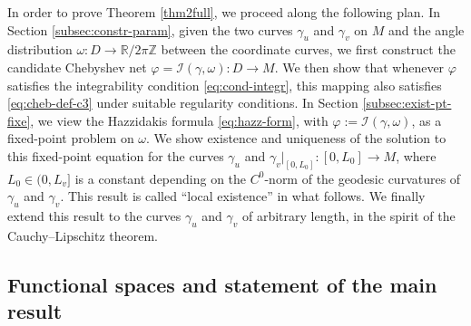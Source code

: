 \documentclass{article}
\newcommand{\I}{\mathcal{I}}
\newcommand{\R}{\mathbb{R}}
\newcommand{\Z}{\mathbb{Z}}
\newcommand{\surf}{M}
\theoremstyle{remark}
\theoremstyle{prpart}
\begin{document}
In order to prove Theorem \ref{thm2full}, we proceed along the following plan. In Section \ref{subsec:constr-param}, given the two curves $\gamma_u$ and $\gamma_v$ on $\surf$ and the angle distribution $\omega:D\to\R/2\pi\Z$ between the coordinate curves, we first construct the candidate Chebyshev net $\varphi=\I(\gamma,\omega):D\to\surf$. We then show that whenever $\varphi$ satisfies the integrability condition \eqref{eq:cond-integr}, this mapping also satisfies \eqref{eq:cheb-def-c3} under suitable regularity conditions.  In Section \ref{subsec:exist-pt-fixe}, we view the Hazzidakis formula \eqref{eq:hazz-form}, with $\varphi:=\I(\gamma,\omega)$, as a fixed-point problem on $\omega$. We show existence and uniqueness of the solution to this fixed-point equation for the curves $\gamma_u$ and $\gamma_v\big|_{[0,L_0]}:[0,L_0]\to\surf$, where $L_0\in(0,L_v]$ is a constant depending on the $C^0$-norm of the geodesic curvatures of $\gamma_u$ and $\gamma_v$. This result is called ``local existence'' in what follows. We finally extend this result to the curves $\gamma_u$ and $\gamma_v$ of arbitrary length, in the spirit of the Cauchy--Lipschitz theorem.

\subsection{Functional spaces and statement of the main result}\label{sec:norms}
\end{document}
